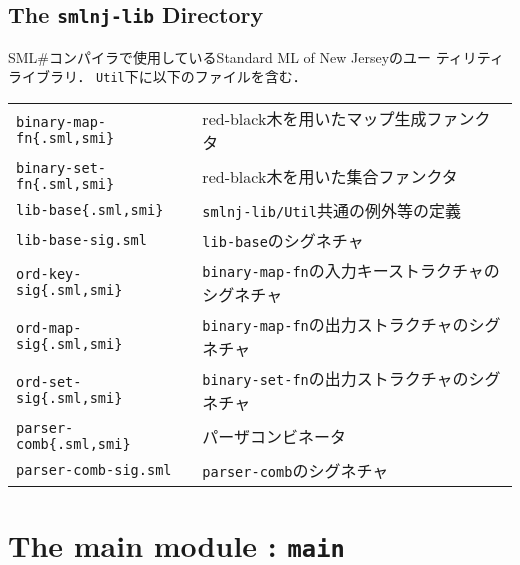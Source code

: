 \documentclass{jbook}
\newcommand{\txt}[2]{#2}
\newcommand{\smlsharp}{SML\#}
\newcommand{\code}[1]{\mbox{\large\tt #1}}
\begin{document}
\section{\txt{\code{smlnj-lib}ディレクトリ}{The \code{smlnj-lib} Directory}}
\ifjp%
	\smlsharp{}コンパイラで使用しているStandard ML of New Jerseyのユー
ティリティライブラリ．
	\code{Util}下に以下のファイルを含む．

\begin{tabular}{ll}
\code{binary-map-fn\{.sml,smi\}} &
red-black木を用いたマップ生成ファンクタ
\\
\code{binary-set-fn\{.sml,smi\}} &
red-black木を用いた集合ファンクタ
\\
\code{lib-base\{.sml,smi\}} &
\code{smlnj-lib/Util}共通の例外等の定義
\\
\code{lib-base-sig.sml} &
\code{lib-base}のシグネチャ
\\
\code{ord-key-sig\{.sml,smi\}} &
\code{binary-map-fn}の入力キーストラクチャのシグネチャ
\\
\code{ord-map-sig\{.sml,smi\}} &
\code{binary-map-fn}の出力ストラクチャのシグネチャ
\\
\code{ord-set-sig\{.sml,smi\}} &
\code{binary-set-fn}の出力ストラクチャのシグネチャ
\\
\code{parser-comb\{.sml,smi\}} &
パーザコンビネータ
\\
\code{parser-comb-sig.sml} &
\code{parser-comb}のシグネチャ
\end{tabular}
\else%
\fi%


% 
\chapter{\txt
{メインモジュール：\code{main}}
{The main module : \code{main}}
}
\label{chap:SimpleMain}
\end{document}
